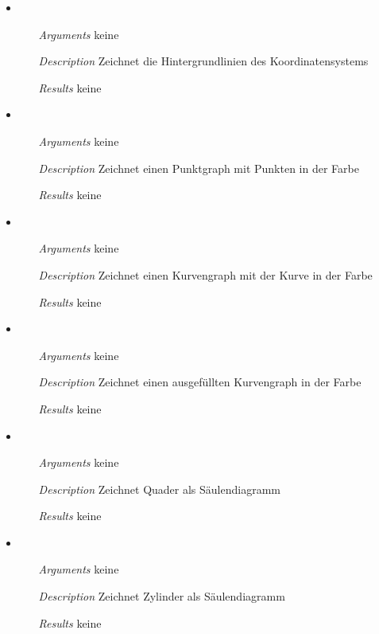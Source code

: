 \begin{itemize}
\item {}
\begin{enumerate}
\item[\textit{Arguments}] keine
\item[\textit{Description}] Zeichnet die Hintergrundlinien des
  Koordinatensystems
\item[\textit{Results}] keine
\end{enumerate}

\item {}
\begin{enumerate}
\item[\textit{Arguments}] keine
\item[\textit{Description}] Zeichnet einen Punktgraph mit Punkten in
  der Farbe 
\item[\textit{Results}] keine
\end{enumerate}

\item {}
\begin{enumerate}
\item[\textit{Arguments}] keine
\item[\textit{Description}] Zeichnet einen Kurvengraph mit der Kurve
  in der Farbe 
\item[\textit{Results}] keine
\end{enumerate}

\item {}
\begin{enumerate}
\item[\textit{Arguments}] keine
\item[\textit{Description}] Zeichnet einen ausgef\"ullten Kurvengraph
  in der Farbe 
\item[\textit{Results}] keine
\end{enumerate}

\item {}
\begin{enumerate}
\item[\textit{Arguments}] keine
\item[\textit{Description}] Zeichnet Quader als S\"aulendiagramm
\item[\textit{Results}] keine
\end{enumerate}

\item {}
\begin{enumerate}
\item[\textit{Arguments}] keine
\item[\textit{Description}] Zeichnet Zylinder als S\"aulendiagramm
\item[\textit{Results}] keine
\end{enumerate}


\end{itemize}
